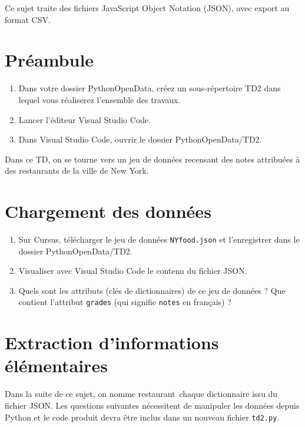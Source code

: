 \documentclass[11pt,a4paper]{article}
\begin{document}
Ce sujet traite des fichiers JavaScript Object Notation (JSON), avec export au format CSV.

\section*{Préambule}
\begin{enumerate}
    \item Dans votre dossier PythonOpenData, créez un sous-répertoire TD2 dans lequel vous réaliserez l'ensemble des travaux.
    \item Lancer l'éditeur Visual Studio Code.
    \item Dans Visual Studio Code, ouvrir le dossier PythonOpenData/TD2. 
\end{enumerate}

Dans ce TD, on se tourne vers un jeu de données recensant des notes attribuées à des restaurants de la ville de New York.

\section{Chargement des données}

\begin{enumerate}
    \item Sur Cursus, télécharger le jeu de données \verb+NYfood.json+ et l'enregistrer dans le dossier PythonOpenData/TD2.
    \item Visualiser avec Visual Studio Code le contenu du fichier JSON.
    \item Quels sont les attributs (clés de dictionnaires) de ce jeu de données ? Que contient l'attribut \verb+grades+ (qui signifie \verb+notes+ en français) ?
\end{enumerate}

\section{Extraction d'informations élémentaires}

Dans la suite de ce sujet, on nomme \og restaurant\fg ~chaque dictionnaire issu du fichier JSON.
Les questions suivantes nécessitent de manipuler les données depuis Python et le code produit devra être inclus dans un nouveau fichier \verb+td2.py+.
\end{document}
